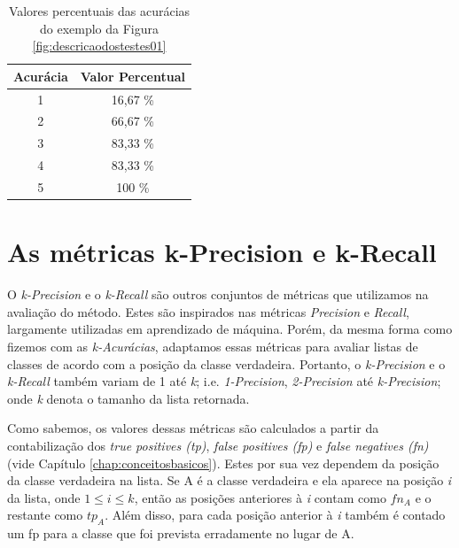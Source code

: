 \begin{table}[h!]
  \begin{center}
    \begin{tabular}{cc}
      \hline
      \textbf{Acurácia} & \textbf{Valor Percentual} \\
      \hline

      1 & 16,67 \% \\
      2 & 66,67 \% \\
      3 & 83,33 \% \\
      4 & 83,33 \% \\
      5 & 100 \% \\

      \hline
    \end{tabular}
    \caption{Valores percentuais das acurácias do exemplo da Figura \ref{fig:descricaodostestes01}}
    \label{tab:valoresacuraciasexemplo}
  \end{center}
\end{table}

\section{As métricas k-Precision e k-Recall}

O \textit{k-Precision} e o \textit{k-Recall} são outros conjuntos de métricas que utilizamos na avaliação do método.
Estes são inspirados nas métricas \textit{Precision} e \textit{Recall}, largamente utilizadas em aprendizado de máquina.
Porém, da mesma forma como fizemos com as \textit{k-Acurácias}, adaptamos essas métricas para avaliar listas de classes de acordo com a posição da classe verdadeira.
Portanto, o \textit{k-Precision} e o \textit{k-Recall} também variam de 1 até \textit{k}; i.e. \textit{1-Precision}, \textit{2-Precision} até \textit{k-Precision}; onde \textit{k} denota o tamanho da lista retornada.

Como sabemos, os valores dessas métricas são calculados a partir da contabilização dos \textit{true positives (tp)}, \textit{false positives (fp)} e \textit{false negatives (fn)} (vide Capítulo \ref{chap:conceitosbasicos}).
Estes por sua vez dependem da posição da classe verdadeira na lista.
Se A é a classe verdadeira e ela aparece na posição \textit{i} da lista, onde $1 \leq \textit{i} \leq \textit{k}$, então as posições anteriores à \textit{i} contam como $fn_A$ e o restante como $tp_A$.
Além disso, para cada posição anterior à \textit{i} também é contado um fp para a classe que foi prevista erradamente no lugar de A.

